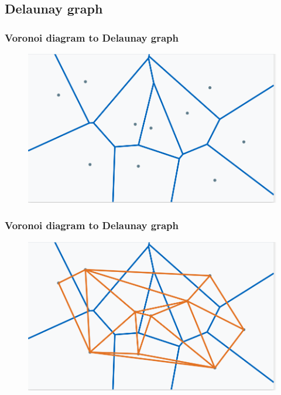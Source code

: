 \documentclass{beamer}
\begin{document}
\subsection{Delaunay graph}
  \begin{frame}
    \frametitle{Voronoi diagram to Delaunay graph}  
  \begin{figure}[voronoi_diagram]
    \vspace*{-0.1cm}
  	\includegraphics[scale=0.3]{voronoi_diagram} 	
  \end{figure} 
  \end{frame} 

  \begin{frame}
    \frametitle{Voronoi diagram to Delaunay graph}  
  \begin{figure}[voronoi_delaunay]
    \vspace*{-0.1cm}
  	\includegraphics[scale=0.3]{voronoi_delaunay} 	
  \end{figure} 
  \end{frame} 
\end{document}
